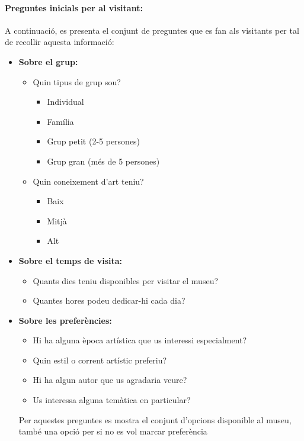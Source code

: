 \documentclass[a4paper]{article}
\begin{document}
	\paragraph{Preguntes inicials per al visitant:}
	A continuació, es presenta el conjunt de preguntes que es fan als visitants per tal de recollir aquesta informació:
	\begin{itemize}
		\item \textbf{Sobre el grup:}
		\begin{itemize}
			\item Quin tipus de grup sou? 
			\begin{itemize}
				\item Individual
				\item Família
				\item Grup petit (2-5 persones)
				\item Grup gran (més de 5 persones)
			\end{itemize}
			\item Quin coneixement d’art teniu? 
			\begin{itemize}
				\item Baix
				\item Mitjà
				\item Alt
			\end{itemize}
		\end{itemize}
		
		\item \textbf{Sobre el temps de visita:}
		\begin{itemize}
			\item Quants dies teniu disponibles per visitar el museu?
			\item Quantes hores podeu dedicar-hi cada dia?
		\end{itemize}
		
		\item \textbf{Sobre les preferències:}
		\begin{itemize}
			\item Hi ha alguna època artística que us interessi especialment?
			\item Quin estil o corrent artístic preferiu?
			\item Hi ha algun autor que us agradaria veure?
			\item Us interessa alguna temàtica en particular?
		\end{itemize}
		Per aquestes preguntes es mostra el conjunt d'opcions disponible al museu, també una opció per si no es vol marcar preferència
	\end{itemize}
\end{document}
